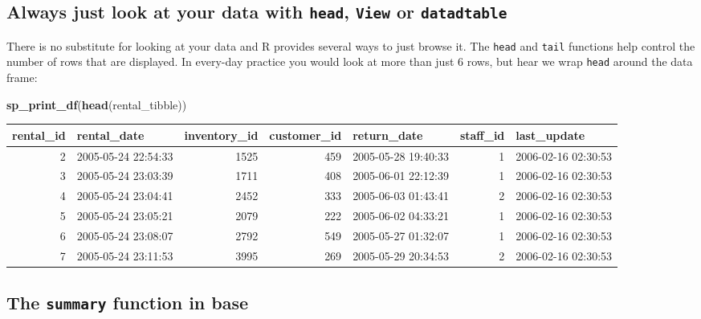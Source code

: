 \documentclass[]{book}
\newenvironment{Shaded}{\begin{snugshade}}{\end{snugshade}}
\newcommand{\KeywordTok}[1]{\textcolor[rgb]{0.13,0.29,0.53}{\textbf{#1}}}
\newcommand{\NormalTok}[1]{#1}
\theoremstyle{definition}
\theoremstyle{definition}
\theoremstyle{definition}
\theoremstyle{remark}
\begin{document}
\hypertarget{always-just-look-at-your-data-with-head-view-or-datadtable}{%
\subsection{\texorpdfstring{Always just look at your data with
\texttt{head}, \texttt{View} or
\texttt{datadtable}}{Always just look at your data with head, View or datadtable}}\label{always-just-look-at-your-data-with-head-view-or-datadtable}}

There is no substitute for looking at your data and R provides several
ways to just browse it. The \texttt{head} and \texttt{tail} functions
help control the number of rows that are displayed. In every-day
practice you would look at more than just 6 rows, but hear we wrap
\texttt{head} around the data frame:

\begin{Shaded}
\begin{Highlighting}[]
\KeywordTok{sp_print_df}\NormalTok{(}\KeywordTok{head}\NormalTok{(rental_tibble))}
\end{Highlighting}
\end{Shaded}

\begin{tabular}{r|l|r|r|l|r|l}
\hline
rental\_id & rental\_date & inventory\_id & customer\_id & return\_date & staff\_id & last\_update\\
\hline
2 & 2005-05-24 22:54:33 & 1525 & 459 & 2005-05-28 19:40:33 & 1 & 2006-02-16 02:30:53\\
\hline
3 & 2005-05-24 23:03:39 & 1711 & 408 & 2005-06-01 22:12:39 & 1 & 2006-02-16 02:30:53\\
\hline
4 & 2005-05-24 23:04:41 & 2452 & 333 & 2005-06-03 01:43:41 & 2 & 2006-02-16 02:30:53\\
\hline
5 & 2005-05-24 23:05:21 & 2079 & 222 & 2005-06-02 04:33:21 & 1 & 2006-02-16 02:30:53\\
\hline
6 & 2005-05-24 23:08:07 & 2792 & 549 & 2005-05-27 01:32:07 & 1 & 2006-02-16 02:30:53\\
\hline
7 & 2005-05-24 23:11:53 & 3995 & 269 & 2005-05-29 20:34:53 & 2 & 2006-02-16 02:30:53\\
\hline
\end{tabular}

\hypertarget{the-summary-function-in-base}{%
\subsection{\texorpdfstring{The \texttt{summary} function in
base}{The summary function in base}}\label{the-summary-function-in-base}}
\end{document}
